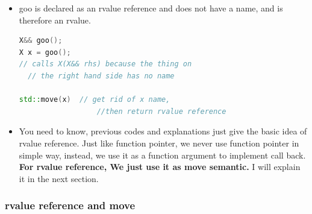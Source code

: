 \documentclass[a4paper,12pt,twoside]{book}
\begin{document}
\begin{itemize}
\item goo is declared as an rvalue reference and does not have a name, and is therefore an rvalue.
\begin{lstlisting}[frame=single, language=c++]
X&& goo();
X x = goo();
// calls X(X&& rhs) because the thing on
  // the right hand side has no name

std::move(x)  // get rid of x name,
                  //then return rvalue reference
\end{lstlisting}

\item You need to know,  previous codes and explanations just give the basic idea of rvalue reference. Just like function pointer, we never use function pointer in simple way, instead, we use it as a function argument to implement call back.  \textbf{For rvalue reference, We just use it as move semantic.} I will explain it in the next section.

\end{itemize}


\subsubsection{rvalue reference and move }
\end{document}
